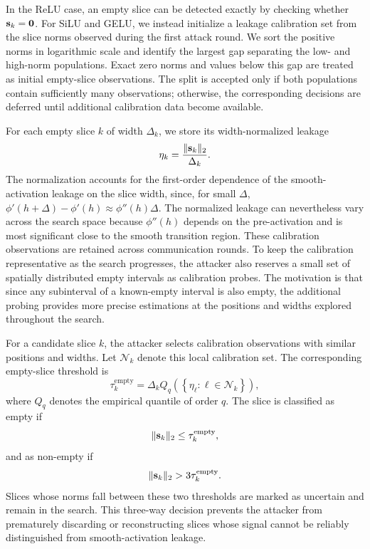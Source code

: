 In the ReLU case, an empty slice can be detected exactly by checking whether $\mathbf{s}_k=\mathbf{0}$. For SiLU and GELU, we instead initialize a leakage calibration set from the slice norms observed during the first attack round. We sort the positive norms in logarithmic scale and identify the largest gap separating the low- and high-norm populations. Exact zero norms and values below this gap are treated as initial empty-slice observations. The split is accepted only if both populations contain sufficiently many observations; otherwise, the corresponding decisions are deferred until additional calibration data become available.

For each empty slice $k$ of width $\Delta_k$, we store its width-normalized leakage
\begin{equation}
\eta_k
=
\frac{\lVert \mathbf{s}_k\rVert_2}{\Delta_k}.
\end{equation}
The normalization accounts for the first-order dependence of the smooth-activation leakage on the slice width, since, for small $\Delta$, $\phi'(h+\Delta)-\phi'(h)\approx\phi''(h)\Delta$. The normalized leakage can nevertheless vary across the search space because $\phi''(h)$ depends on the pre-activation and is most significant close to the smooth transition region. 
These calibration observations are retained across communication rounds. To keep the calibration representative as the search progresses, the attacker also reserves a small set of spatially distributed empty intervals as calibration probes. The motivation is that since any subinterval of a known-empty interval is also empty, the additional probing provides more precise estimations at the positions and widths explored throughout the search.

For a candidate slice $k$, the attacker selects calibration observations with similar positions and widths. Let $\mathcal{N}_k$ denote this local calibration set. The corresponding empty-slice threshold is\begin{equation}
\tau_k^{\mathrm{empty}}
=
\Delta_k
Q_q
\left(
\left\{
\eta_\ell:
\ell\in\mathcal{N}_k
\right\}
\right),
\end{equation}
where $Q_q$ denotes the empirical quantile of order $q$. The slice is classified as empty if
\begin{equation*}
\lVert \mathbf{s}_k\rVert_2
\leq
\tau_k^{\mathrm{empty}},
\end{equation*}
and as non-empty if
\begin{equation*}
\lVert \mathbf{s}_k\rVert_2
>
3
\tau_k^{\mathrm{empty}}.
\end{equation*}
Slices whose norms fall between these two thresholds are marked as uncertain and remain in the search. This three-way decision prevents the attacker from prematurely discarding or reconstructing slices whose signal cannot be reliably distinguished from smooth-activation leakage.


